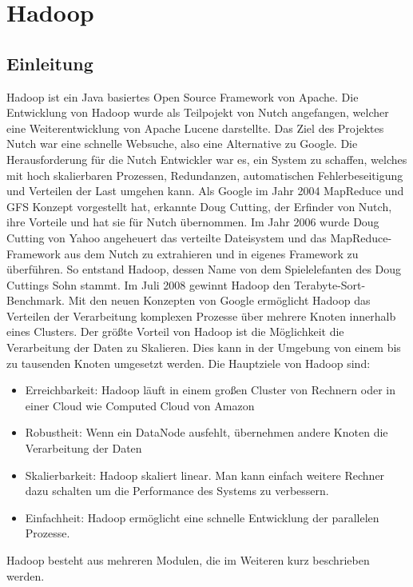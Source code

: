 \section{Hadoop}
\cite{Wartal2012}
\cite{Endlich2011}
\subsection{Einleitung}
Hadoop ist ein Java basiertes Open Source Framework von Apache. 
Die Entwicklung von Hadoop wurde als Teilpojekt von Nutch angefangen, welcher eine Weiterentwicklung von Apache Lucene darstellte. Das Ziel des Projektes Nutch war eine schnelle Websuche, also eine Alternative zu Google. Die Herausforderung für die Nutch Entwickler war es, ein System zu schaffen, welches mit hoch skalierbaren Prozessen, Redundanzen, automatischen Fehlerbeseitigung und Verteilen der Last umgehen kann. Als Google im Jahr 2004 MapReduce und \ac{GFS} Konzept vorgestellt hat, erkannte Doug Cutting, der Erfinder von Nutch, ihre Vorteile und hat sie für Nutch  übernommen. Im Jahr 2006 wurde Doug Cutting von Yahoo angeheuert das verteilte Dateisystem und das MapReduce-Framework aus dem Nutch zu extrahieren und in eigenes Framework zu überführen. So entstand Hadoop, dessen Name von dem Spielelefanten des Doug Cuttings Sohn stammt. Im Juli 2008 gewinnt Hadoop den Terabyte-Sort-Benchmark. \cite[S. 24]{Wartal2012}
Mit den neuen Konzepten von Google ermöglicht Hadoop das Verteilen der Verarbeitung komplexen Prozesse über mehrere Knoten innerhalb eines Clusters. Der größte Vorteil von Hadoop ist die Möglichkeit die  Verarbeitung der Daten zu Skalieren. Dies kann in der Umgebung von einem bis zu tausenden Knoten umgesetzt werden.
Die Hauptziele von Hadoop sind:
\begin{itemize}
\item Erreichbarkeit: Hadoop läuft in einem großen Cluster von Rechnern oder in einer Cloud wie Computed Cloud von Amazon
\item Robustheit: Wenn ein DataNode ausfehlt, übernehmen andere Knoten die Verarbeitung der Daten
\item Skalierbarkeit: Hadoop skaliert linear. Man kann einfach weitere Rechner dazu schalten um die Performance des Systems zu verbessern.
\item Einfachheit: Hadoop ermöglicht eine schnelle Entwicklung der parallelen Prozesse.
\cite{HadoopInAction}
\end{itemize}
Hadoop besteht aus mehreren Modulen, die im Weiteren kurz beschrieben werden.
